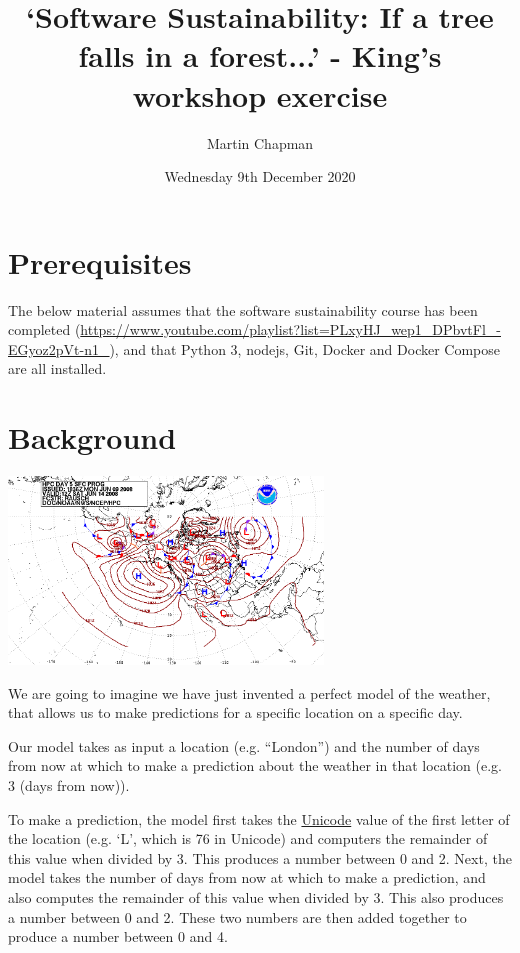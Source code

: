 \documentclass{article}
\title{`Software Sustainability: If a tree falls in a forest...' -
King's workshop exercise}
\author{Martin Chapman}
\date{Wednesday 9th December 2020}
\begin{document}

\maketitle

\section{Prerequisites}

The below material assumes
that the software sustainability course has been completed
(\href{https://www.youtube.com/playlist?list=PLxyHJ\_wep1\_DPbvtFl\_-EGyoz2pVt-n1\_}{https://www.youtube.com/playlist?list=PLxyHJ\_wep1\_DPbvtFl\_-EGyoz2pVt-n1\_}),
and that Python 3, nodejs, Git, Docker and Docker Compose are all
installed.

\section{Background}

\begin{center}
    \includegraphics[height=5cm]{weather.png}
\end{center}

We are going to imagine we have just invented a perfect model of the
weather, that allows us to make predictions for a specific location on
a specific day.

Our model takes as input a location (e.g. ``London'') and the number of
days from now at which to make a prediction about the weather in that
location (e.g. 3 (days from now)).

To make a prediction, the model first takes the
\href{https://en.wikipedia.org/wiki/List_of_Unicode_characters}{Unicode}
value of the first letter of the location (e.g. `L', which is 76 in
Unicode) and computers the remainder of this value when divided by
3. This produces a number between 0 and 2. Next, the model takes the
number of days from now at which to make a prediction, and also computes
the remainder of this value when divided by 3.  This also produces a
number between 0 and 2. These two numbers are then added together to
produce a number between 0 and 4.
\end{document}
